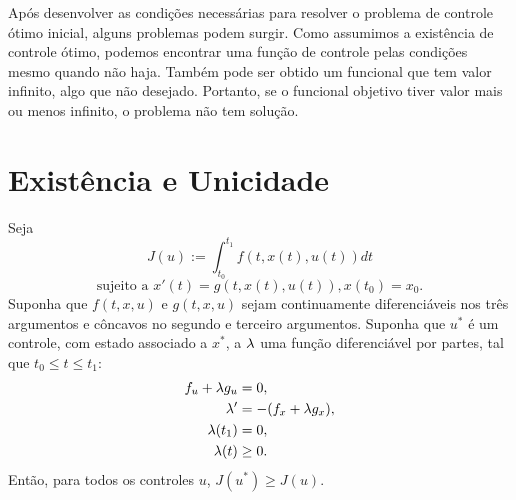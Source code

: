 Após desenvolver as condições necessárias para resolver o problema de controle
ótimo inicial, alguns problemas podem surgir. Como assumimos a existência de
controle ótimo, podemos encontrar uma função de controle pelas condições mesmo
quando não haja. Também pode ser obtido um funcional que tem valor infinito, algo que não
desejado. Portanto, se o funcional objetivo tiver valor mais ou menos
infinito, o problema não tem solução. 

\section{Existência e Unicidade}

\begin{theorem}
    Seja $$J(u) := \int_{t_0}^{t_1} f(t,x(t),u(t))dt$$ 
    $$\text{sujeito a } x'(t) = g(t,x(t),u(t)), x(t_0) = x_0.$$ 
    Suponha que $f(t,x,u)$ e $g(t,x,u)$ sejam continuamente diferenciáveis nos
    três argumentos e côncavos no segundo e terceiro argumentos. Suponha que
    $u^*$ é um controle, com estado associado a $x^*$, a $\lambda$ uma função
    diferenciável por partes, tal que $t_0 \le t \le t_1$: 
    \begin{subequations}
        \label{eq:conditions}
        \begin{align}
            f_u + \lambda g_u &= 0, \label{rel1} \\
            \lambda ' &= - (f_x + \lambda g_x),  \label{rel2} \\ 
            \lambda(t_1) &= 0, \label{rel3} \\
            \lambda(t) &\ge 0. \label{rel4}
        \end{align}
    \end{subequations}
    Então, para todos os controles $u$, $J(u^*) \ge J(u)$. 
\end{theorem}

